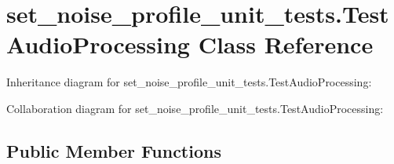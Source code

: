 \hypertarget{classset__noise__profile__unit__tests_1_1TestAudioProcessing}{\section{set\-\_\-noise\-\_\-profile\-\_\-unit\-\_\-tests.\-Test\-Audio\-Processing Class Reference}
\label{classset__noise__profile__unit__tests_1_1TestAudioProcessing}
}


Inheritance diagram for set\-\_\-noise\-\_\-profile\-\_\-unit\-\_\-tests.\-Test\-Audio\-Processing\-:


Collaboration diagram for set\-\_\-noise\-\_\-profile\-\_\-unit\-\_\-tests.\-Test\-Audio\-Processing\-:
\subsection*{Public Member Functions}
